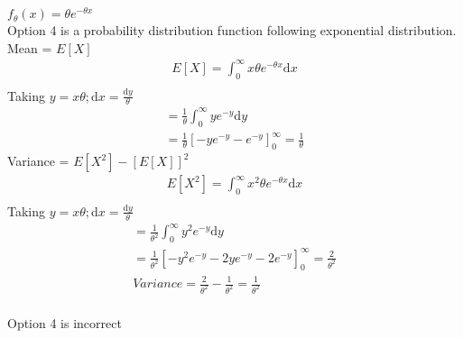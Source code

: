 \documentclass[12pt]{article}
\begin{document}
 $f_{\theta}(x) = {\theta}e^{-{\theta}x}$ \\
Option 4 is a probability distribution function following exponential distribution. \\
Mean = $E[X]$
\begin{align*}
    E[X] = \int_{0}^{\infty}{x}{\theta}e^{-{\theta}x}\mathrm{d}x \\
\end{align*}
Taking $y = {x}{\theta}; \mathrm{d}x = \frac{\mathrm{d}y}{\theta}$ \\
\begin{align*}
    = \frac{1}{\theta}\int_{0}^{\infty}{y{e^{-y}}\mathrm{d}y} \\
    = \frac{1}{\theta}[-ye^{-y} -e^{-y}]_{0}^{\infty} = \frac{1}{\theta}
\end{align*}
Variance = $E[X^{2}] - [E[X]]^{2}$\\
\begin{align*}
    E[X^{2}] = \int_{0}^{\infty}{x^{2}}{\theta}e^{-{\theta}x}\mathrm{d}x \\
\end{align*}
Taking $y = {x}{\theta}; \mathrm{d}x = \frac{\mathrm{d}y}{\theta}$ \\
\begin{align*}
    = \frac{1}{\theta^{2}}\int_{0}^{\infty}{y^{2}e^{-y}}\mathrm{d}y \\
    = \frac{1}{\theta^{2}}[-y^{2}e^{-y} -2ye^{-y} -2e^{-y}]_{0}^{\infty} = \frac{2}{\theta^{2}}\\
    Variance = \frac{2}{\theta^{2}} - \frac{1}{\theta^{2}} = \frac{1}{\theta^{2}}\\
\end{align*}

Option 4 is incorrect
\end{document}
